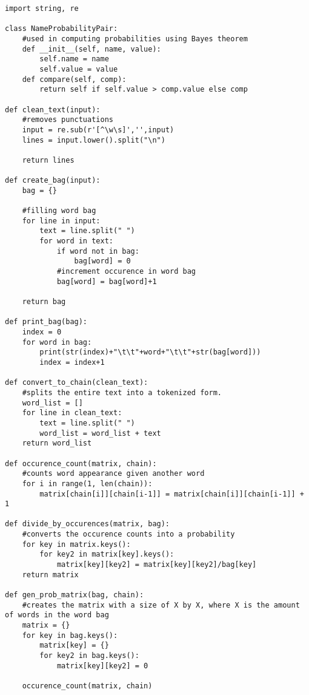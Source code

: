 \documentclass[onecolumn]{./IEEE/IEEEtran}
\title{\SPTITLE}
\begin{document}
\maketitle

\begin{lstlisting}
import string, re

class NameProbabilityPair:
    #used in computing probabilities using Bayes theorem
    def __init__(self, name, value):
        self.name = name
        self.value = value
    def compare(self, comp):
        return self if self.value > comp.value else comp

def clean_text(input):
    #removes punctuations
    input = re.sub(r'[^\w\s]','',input)
    lines = input.lower().split("\n")

    return lines

def create_bag(input):
    bag = {}

    #filling word bag
    for line in input:
        text = line.split(" ")
        for word in text:
            if word not in bag:
                bag[word] = 0
            #increment occurence in word bag
            bag[word] = bag[word]+1

    return bag

def print_bag(bag):
    index = 0
    for word in bag:
        print(str(index)+"\t\t"+word+"\t\t"+str(bag[word]))
        index = index+1

def convert_to_chain(clean_text):
    #splits the entire text into a tokenized form.
    word_list = []
    for line in clean_text:
        text = line.split(" ")
        word_list = word_list + text
    return word_list

def occurence_count(matrix, chain):
    #counts word appearance given another word
    for i in range(1, len(chain)):
        matrix[chain[i]][chain[i-1]] = matrix[chain[i]][chain[i-1]] + 1

def divide_by_occurences(matrix, bag):
    #converts the occurence counts into a probability
    for key in matrix.keys():
        for key2 in matrix[key].keys():
            matrix[key][key2] = matrix[key][key2]/bag[key]
    return matrix

def gen_prob_matrix(bag, chain):
    #creates the matrix with a size of X by X, where X is the amount of words in the word bag
    matrix = {}
    for key in bag.keys():
        matrix[key] = {}
        for key2 in bag.keys():
            matrix[key][key2] = 0

    occurence_count(matrix, chain)


\end{lstlisting}
\end{document}
